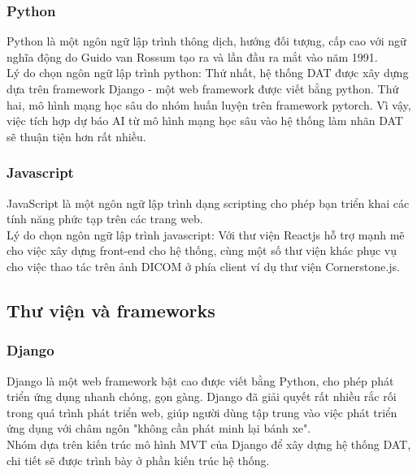 \subsubsection{Python}
Python là một ngôn ngữ lập trình thông dịch, hướng đối tượng, cấp cao với ngữ nghĩa động do Guido van Rossum tạo ra và lần đầu ra mắt vào năm 1991. \\
\indent Lý do chọn ngôn ngữ lập trình python: Thứ nhất, hệ thống DAT được xây dựng dựa trên framework Django - một web framework được viết bằng python. Thứ hai, mô hình mạng học sâu do nhóm huấn luyện trên framework pytorch. Vì vậy, việc tích hợp  dự báo AI từ mô hình mạng học sâu vào hệ thống làm nhãn DAT sẽ thuận tiện hơn rất nhiều. 

\subsubsection{Javascript}
JavaScript là một ngôn ngữ lập trình dạng scripting cho phép bạn triển khai các tính năng phức tạp trên các trang web. \\
\indent Lý do chọn ngôn ngữ lập trình javascript: Với thư viện Reactjs hỗ  trợ mạnh mẽ cho việc xây dựng front-end cho hệ thống, cùng một số thư viện khác phục vụ cho việc thao tác trên ảnh DICOM ở phía client ví dụ thư viện Cornerstone.js.
\subsection{Thư viện và frameworks}
\subsubsection{Django}
Django là một web framework bật cao được viết bằng Python, cho phép phát triển ứng dụng nhanh chóng, gọn gàng. Django đã giải quyết rất nhiều rắc rối trong quá trình phát triển web, giúp người dùng tập trung vào việc phát triển ứng dụng với châm ngôn "không cần phát minh lại bánh xe".\\
\indent Nhóm dựa trên kiến trúc mô hình MVT của Django để xây dựng hệ thống DAT, chi tiết sẽ được trình bày ở phần kiến trúc hệ thống. 

